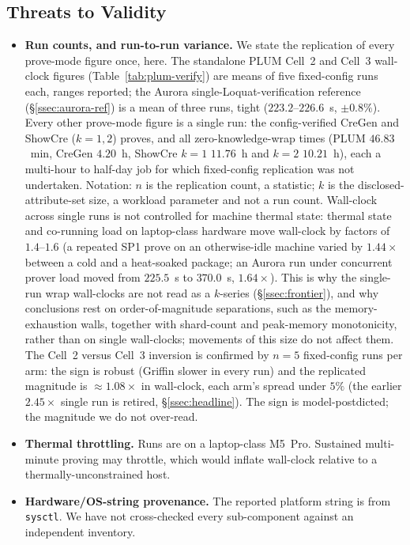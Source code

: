 \subsection{Threats to Validity}\label{ssec:threats}
\begin{itemize}
  \item \textbf{Run counts, and run-to-run variance.} We state the replication of every prove-mode figure once, here. The standalone PLUM Cell~2 and Cell~3 wall-clock figures (Table~\ref{tab:plum-verify}) are means of five fixed-config runs each, ranges reported; the Aurora single-Loquat-verification reference (\S\ref{ssec:aurora-ref}) is a mean of three runs, tight ($223.2$--$226.6$~s, $\pm0.8\%$). Every other prove-mode figure is a single run: the config-verified CreGen and ShowCre ($k{=}1,2$) proves, and all zero-knowledge-wrap times (PLUM $46.83$~min, CreGen $4.20$~h, ShowCre $k{=}1$ $11.76$~h and $k{=}2$ $10.21$~h), each a multi-hour to half-day job for which fixed-config replication was not undertaken. Notation: $n$ is the replication count, a statistic; $k$ is the disclosed-attribute-set size, a workload parameter and not a run count. Wall-clock across single runs is not controlled for machine thermal state: thermal state and co-running load on laptop-class hardware move wall-clock by factors of $1.4$--$1.6$ (a repeated SP1 prove on an otherwise-idle machine varied by $1.44\times$ between a cold and a heat-soaked package; an Aurora run under concurrent prover load moved from $225.5$~s to $370.0$~s, $1.64\times$). This is why the single-run wrap wall-clocks are not read as a $k$-series (\S\ref{ssec:frontier}), and why conclusions rest on order-of-magnitude separations, such as the memory-exhaustion walls, together with shard-count and peak-memory monotonicity, rather than on single wall-clocks; movements of this size do not affect them. The Cell~2 versus Cell~3 inversion is confirmed by $n=5$ fixed-config runs per arm: the sign is robust (Griffin slower in every run) and the replicated magnitude is ${\approx}1.08\times$ in wall-clock, each arm's spread under $5\%$ (the earlier $2.45\times$ single run is retired, \S\ref{ssec:headline}). The sign is model-postdicted; the magnitude we do not over-read.
  \item \textbf{Thermal throttling.} Runs are on a laptop-class M5~Pro. Sustained multi-minute proving may throttle, which would inflate wall-clock relative to a thermally-unconstrained host.
  \item \textbf{Hardware/OS-string provenance.} The reported platform string is from \texttt{sysctl}. We have not cross-checked every sub-component against an independent inventory.

\end{itemize}
